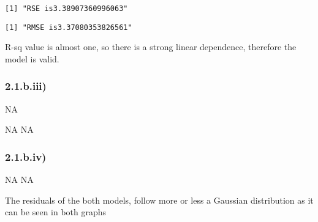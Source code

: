 \documentclass[
]{article}
\newenvironment{Shaded}{\begin{snugshade}}{\end{snugshade}}
\newcommand{\ConstantTok}[1]{\textcolor[rgb]{0.00,0.00,0.00}{#1}}
\newcommand{\DecValTok}[1]{\textcolor[rgb]{0.00,0.00,0.81}{#1}}
\newcommand{\FunctionTok}[1]{\textcolor[rgb]{0.00,0.00,0.00}{#1}}
\newcommand{\NormalTok}[1]{#1}
\newcommand{\SpecialCharTok}[1]{\textcolor[rgb]{0.00,0.00,0.00}{#1}}
\newcommand{\StringTok}[1]{\textcolor[rgb]{0.31,0.60,0.02}{#1}}
\begin{document}
\begin{verbatim}
[1] "RSE is3.38907360996063"
\end{verbatim}

\begin{Shaded}
\end{Shaded}

\begin{verbatim}
[1] "RMSE is3.37080353826561"
\end{verbatim}

R-sq value is almost one, so there is a strong linear dependence,
therefore the model is valid.

\hypertarget{b.iii}{%
\subsubsection{2.1.b.iii)}\label{b.iii}}

\begin{Shaded}
\begin{Highlighting}[]
\ConstantTok{NA}
\end{Highlighting}
\end{Shaded}

\begin{Shaded}
\begin{Highlighting}[]
\ConstantTok{NA}
\ConstantTok{NA}
\end{Highlighting}
\end{Shaded}

\hypertarget{b.iv}{%
\subsubsection{2.1.b.iv)}\label{b.iv}}

\begin{Shaded}
\begin{Highlighting}[]
\ConstantTok{NA}
\ConstantTok{NA}
\end{Highlighting}
\end{Shaded}

The residuals of the both models, follow more or less a Gaussian
distribution as it can be seen in both graphs
\end{document}
